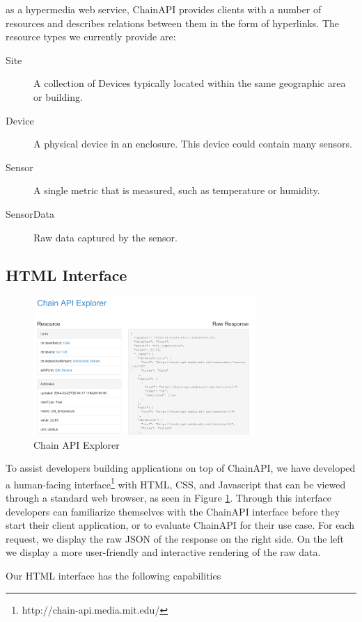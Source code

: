 \documentclass{acm_proc_article-sp}
\begin{document}
as a hypermedia web service, ChainAPI provides clients with a number of
resources and describes relations between them in the form of hyperlinks.  The
resource types we currently provide are:

\begin{description}
    \item[Site] A collection of Devices typically located within the same
        geographic area or building.
    \item[Device] A physical device in an enclosure. This device could contain
        many sensors.
    \item[Sensor] A single metric that is measured, such as temperature or humidity.
    \item[SensorData] Raw data captured by the sensor.
\end{description}

\subsection{HTML Interface}

\begin{figure}
    \centering
    \includegraphics[width=8.45cm, frame]{chain_explorer2}
    \caption{Chain API Explorer}
    \label{chain_explorer}
\end{figure}

To assist developers building applications on top of ChainAPI, we have
developed a human-facing interface\footnote{http://chain-api.media.mit.edu/}
with HTML, CSS, and Javascript that can be viewed through a standard web
browser, as seen in Figure \ref{chain_explorer}.  Through this interface
developers can familiarize themselves with the ChainAPI interface before they
start their client application, or to evaluate ChainAPI for their use case.
For each request, we display the raw JSON of the response on the right side. On
the left we display a more user-friendly and interactive rendering of the raw
data.

Our HTML interface has the following capabilities
\end{document}

